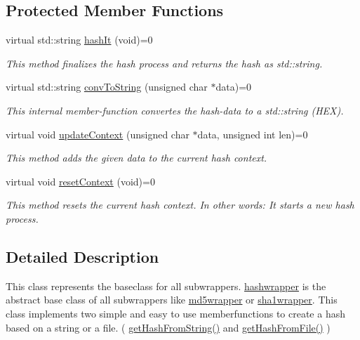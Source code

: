 \subsection*{Protected Member Functions}
\begin{DoxyCompactItemize}
\item 
virtual std::string \hyperlink{classhashwrapper_a53f97c06885ed2b1fa255759a957a782}{hashIt} (void)=0
\begin{DoxyCompactList}\small\item\em This method finalizes the hash process and returns the hash as std::string. \item\end{DoxyCompactList}\item 
virtual std::string \hyperlink{classhashwrapper_a1dacf43b1b726cd19a09d11eba6cd082}{convToString} (unsigned char $\ast$data)=0
\begin{DoxyCompactList}\small\item\em This internal member-\/function convertes the hash-\/data to a std::string (HEX). \item\end{DoxyCompactList}\item 
virtual void \hyperlink{classhashwrapper_a7fe42ccf310e7d2cfe95f61732b73197}{updateContext} (unsigned char $\ast$data, unsigned int len)=0
\begin{DoxyCompactList}\small\item\em This method adds the given data to the current hash context. \item\end{DoxyCompactList}\item 
virtual void \hyperlink{classhashwrapper_aa7d46e9630a794ff08cfb5307660a86d}{resetContext} (void)=0
\begin{DoxyCompactList}\small\item\em This method resets the current hash context. In other words: It starts a new hash process. \item\end{DoxyCompactList}\end{DoxyCompactItemize}


\subsection{Detailed Description}
This class represents the baseclass for all subwrappers. \hyperlink{classhashwrapper}{hashwrapper} is the abstract base class of all subwrappers like \hyperlink{classmd5wrapper}{md5wrapper} or \hyperlink{classsha1wrapper}{sha1wrapper}. This class implements two simple and easy to use memberfunctions to create a hash based on a string or a file. ( \hyperlink{classhashwrapper_aa10904f0dc06eb54771ab26864622d0f}{getHashFromString()} and \hyperlink{classhashwrapper_ae4767e76e6d9e2b24b41f01ab9e7f03c}{getHashFromFile()} )

